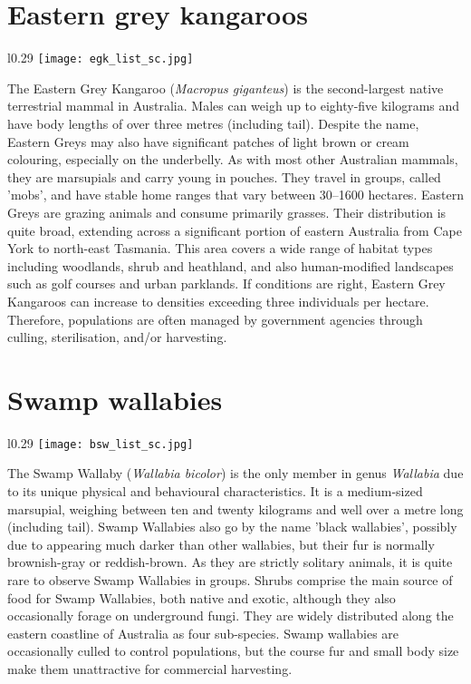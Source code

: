 \section{Eastern grey kangaroos}\label{egk}
\vspace{-0.3cm}
\setlength\intextsep{0pt}
\begin{wrapfigure}[5]{l}{0.29\textwidth}
\centering
\texttt{[image: egk\_list\_sc.jpg]}
\end{wrapfigure}
The Eastern Grey Kangaroo (\textit{Macropus giganteus}) is the second-largest native terrestrial mammal in Australia. Males can weigh up to eighty-five kilograms and have body lengths of over three metres (including tail). Despite the name, Eastern Greys may also have significant patches of light brown or cream colouring, especially on the underbelly. As with most other Australian mammals, they are marsupials and carry young in pouches. They travel in groups, called 'mobs', and have stable home ranges that vary between 30--1600 hectares. Eastern Greys are grazing animals and consume primarily grasses. Their distribution is quite broad, extending across a significant portion of eastern Australia from Cape York to north-east Tasmania. This area covers a wide range of habitat types including woodlands, shrub and heathland, and also human-modified landscapes such as golf courses and urban parklands. If conditions are right, Eastern Grey Kangaroos can increase to densities exceeding three individuals per hectare. Therefore, populations are often managed by government agencies through culling, sterilisation, and/or harvesting.

\section{Swamp wallabies}\label{bsw}
\vspace{-0.3cm}
\setlength\intextsep{0pt}
\begin{wrapfigure}{l}{0.29\textwidth}
\centering
\texttt{[image: bsw\_list\_sc.jpg]}
\end{wrapfigure}
The Swamp Wallaby (\textit{Wallabia bicolor}) is the only member in genus \textit{Wallabia} due to its unique physical and behavioural characteristics. It is a medium-sized marsupial, weighing between ten and twenty kilograms and well over a metre long (including tail). Swamp Wallabies also go by the name 'black wallabies', possibly due to appearing much darker than other wallabies, but their fur is normally brownish-gray or reddish-brown. As they are strictly solitary animals, it is quite rare to observe Swamp Wallabies in groups. Shrubs comprise the main source of food for Swamp Wallabies, both native and exotic, although they also occasionally forage on underground fungi. They are widely distributed along the eastern coastline of Australia as four sub-species. Swamp wallabies are occasionally culled to control populations, but the course fur and small body size make them unattractive for commercial harvesting.

